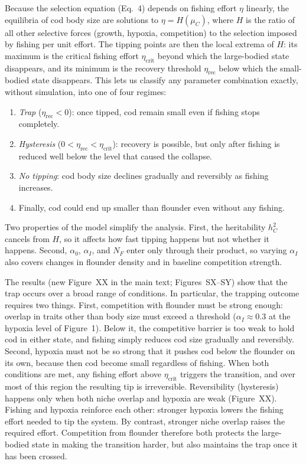 \documentclass[11pt]{article}
\begin{document}
Because the selection equation (Eq.~4) depends on fishing effort $\eta$ linearly, the equilibria of cod body size are solutions to $\eta = H(\mu_C)$, where $H$ is the ratio of all other selective forces (growth, hypoxia, competition) to the selection imposed by fishing per unit effort. The tipping points are then the local extrema of $H$: its maximum is the critical fishing effort $\eta_{\text{crit}}$ beyond which the large-bodied state disappears, and its minimum is the recovery threshold $\eta_{\text{rec}}$ below which the small-bodied state disappears. This lets us classify any parameter combination exactly, without simulation, into one of four regimes:
\begin{enumerate}
  \item \textit{Trap} ($\eta_{\text{rec}} < 0$): once tipped, cod remain small even if fishing stops completely.
  \item \textit{Hysteresis} ($0 < \eta_{\text{rec}} < \eta_{\text{crit}}$): recovery is possible, but only after fishing is reduced well below the level that caused the collapse.
  \item \textit{No tipping}: cod body size declines gradually and reversibly as fishing increases.
  \item Finally, cod could end up smaller than flounder even without any fishing.
\end{enumerate}
Two properties of the model simplify the analysis. First, the heritability $h_C^2$ cancels from $H$, so it affects how fast tipping happens but not whether it happens. Second, $\alpha_0$, $\alpha_I$, and $N_F$ enter only through their product, so varying $\alpha_I$ also covers changes in flounder density and in baseline competition strength.

The results (new Figure~XX in the main text; Figures~SX--SY) show that the trap occurs over a broad range of conditions. In particular, the trapping outcome requires two things. First, competition with flounder must be strong enough: overlap in traits other than body size must exceed a threshold ($\alpha_I \approx 0.3$ at the hypoxia level of Figure~1). Below it, the competitive barrier is too weak to hold cod in either state, and fishing simply reduces cod size gradually and reversibly. Second, hypoxia must not be so strong that it pushes cod below the flounder on its own, because then cod become small regardless of fishing. When both conditions are met, any fishing effort above $\eta_{\text{crit}}$ triggers the transition, and over most of this region the resulting tip is irreversible. Reversibility (hysteresis) happens only when both niche overlap and hypoxia are weak (Figure~XX). Fishing and hypoxia reinforce each other: stronger hypoxia lowers the fishing effort needed to tip the system. By contrast, stronger niche overlap raises the required effort. Competition from flounder therefore both protects the large-bodied state in making the transition harder, but also maintains the trap once it has been crossed.
\end{document}
